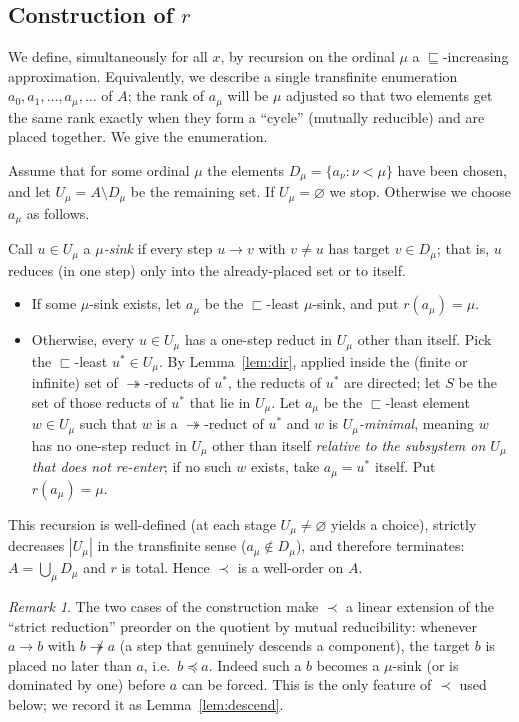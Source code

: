 \documentclass{amsart}
\theoremstyle{definition}
\theoremstyle{remark}
\newtheorem{remark}{Remark}
\newcommand{\redto}{\rightarrow}
\newcommand{\redtt}{\twoheadrightarrow}
\begin{document}
\subsection*{Construction of $r$}
We define, simultaneously for all $x$, by recursion on the ordinal $\mu$ a
$\sqsubseteq$-increasing approximation.  Equivalently, we describe a single
transfinite enumeration $a_0,a_1,\dots,a_\mu,\dots$ of $A$; the rank of $a_\mu$
will be $\mu$ adjusted so that two elements get the same rank exactly when they
form a ``cycle'' (mutually reducible) and are placed together.  We give the
enumeration.

Assume that for some ordinal $\mu$ the elements $D_\mu=\{a_\nu:\nu<\mu\}$ have
been chosen, and let $U_\mu=A\setminus D_\mu$ be the remaining set.  If
$U_\mu=\varnothing$ we stop.  Otherwise we choose $a_\mu$ as follows.

Call $u\in U_\mu$ a \emph{$\mu$-sink} if every step $u\redto v$ with $v\neq u$
has target $v\in D_\mu$; that is, $u$ reduces (in one step) only into the
already-placed set or to itself.  
\begin{itemize}
\item If some $\mu$-sink exists, let $a_\mu$ be the $\sqsubset$-least
$\mu$-sink, and put $r(a_\mu)=\mu$.
\item Otherwise, every $u\in U_\mu$ has a one-step reduct in $U_\mu$ other than
itself.  Pick the $\sqsubset$-least $u^\ast\in U_\mu$.  By
Lemma~\ref{lem:dir}, applied inside the (finite or infinite) set of $\redtt$-reducts
of $u^\ast$, the reducts of $u^\ast$ are directed; let $S$ be the set of those
reducts of $u^\ast$ that lie in $U_\mu$.  Let $a_\mu$ be the $\sqsubset$-least
element $w\in U_\mu$ such that $w$ is a $\redtt$-reduct of $u^\ast$ and $w$ is
\emph{$U_\mu$-minimal}, meaning $w$ has no one-step reduct in $U_\mu$ other than
itself \emph{relative to the subsystem on $U_\mu$ that does not re-enter}; if no
such $w$ exists, take $a_\mu=u^\ast$ itself.  Put $r(a_\mu)=\mu$.
\end{itemize}

This recursion is well-defined (at each stage $U_\mu\neq\varnothing$ yields a
choice), strictly decreases $|U_\mu|$ in the transfinite sense ($a_\mu\notin
D_\mu$), and therefore terminates: $A=\bigcup_\mu D_\mu$ and $r$ is total.
Hence $\prec$ is a well-order on $A$.

\begin{remark}
The two cases of the construction make $\prec$ a linear extension of the
``strict reduction'' preorder on the quotient by mutual reducibility: whenever
$a\redto b$ with $b\not\redtt a$ (a step that genuinely descends a component),
the target $b$ is placed no later than $a$, i.e.\ $b\preceq a$.  Indeed such a
$b$ becomes a $\mu$-sink (or is dominated by one) before $a$ can be forced.
This is the only feature of $\prec$ used below; we record it as
Lemma~\ref{lem:descend}.
\end{remark}
\end{document}
